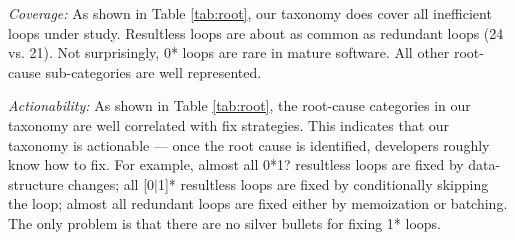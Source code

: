 

\textit{Coverage:}
As shown in Table \ref{tab:root}, 
our taxonomy does cover all inefficient loops under study. 
Resultless loops are about as common as redundant loops
(24 vs. 21).
Not surprisingly, 0* loops
are rare in mature software. 
All other root-cause sub-categories are well represented.


\textit{Actionability:}
As shown in Table \ref{tab:root}, 
the root-cause categories in our taxonomy are well correlated with
fix strategies.
This indicates that our taxonomy is actionable --- once the root cause
is identified, developers roughly know how to fix.
For example, 
almost all 0*1? resultless loops are fixed by data-structure changes;
all [0$|$1]* resultless loops are
fixed by conditionally skipping the loop;
almost all redundant loops are fixed either by 
memoization or batching. 
The only problem is that there are no silver bullets for fixing 1* loops.

